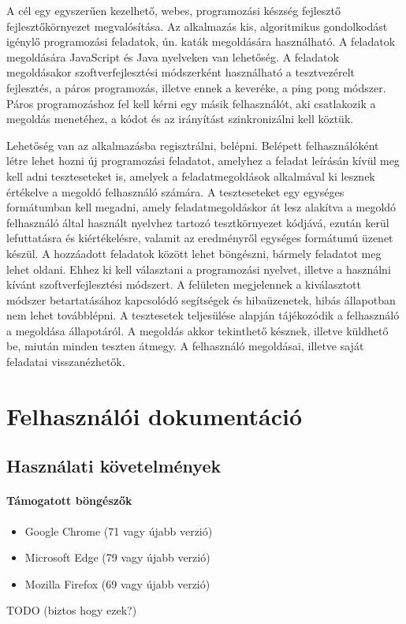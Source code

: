 \documentclass{elteikthesis}
\begin{document}
			A cél egy egyszerűen kezelhető, webes, programozási készség fejlesztő fejlesztőkörnyezet megvalósítása. Az alkalmazás kis, algoritmikus gondolkodást igénylő programozási feladatok, ún. katák megoldására használható. A feladatok megoldására JavaScript és Java nyelveken van lehetőség. A feladatok megoldásakor szoftverfejlesztési módszerként használható a tesztvezérelt fejlesztés, a páros programozás, illetve ennek a keveréke, a ping pong módszer. Páros programozáshoz fel kell kérni egy másik felhasználót, aki csatlakozik a megoldás menetéhez, a kódot és az irányítást szinkronizálni kell köztük.
		
			Lehetőség van az alkalmazásba regisztrálni, belépni. Belépett felhasználóként létre lehet hozni új programozási feladatot, amelyhez a feladat leírásán kívül meg kell adni teszteseteket is, amelyek a feladatmegoldások alkalmával ki lesznek értékelve a megoldó felhasználó számára. A teszteseteket egy egységes formátumban kell megadni, amely feladatmegoldáskor át lesz alakítva a megoldó felhasználó által használt nyelvhez tartozó tesztkörnyezet kódjává, ezután kerül lefuttatásra és kiértékelésre, valamit az eredményről egységes formátumú üzenet készül. A hozzáadott feladatok között lehet böngészni, bármely feladatot meg lehet oldani. Ehhez ki kell választani a programozási nyelvet, illetve a használni kívánt szoftverfejlesztési módszert. A felületen megjelennek a kiválasztott módszer betartatásához kapcsolódó segítségek és hibaüzenetek, hibás állapotban nem lehet továbblépni. A tesztesetek teljesülése alapján tájékozódik a felhasználó a megoldása állapotáról. A megoldás akkor tekinthető késznek, illetve küldhető be, miután minden teszten átmegy. A felhasználó megoldásai, illetve saját feladatai visszanézhetők.

	\chapter{Felhasználói dokumentáció}
		
		\section{Használati követelmények}
			\subsubsection{Támogatott böngészők}
				\begin{itemize}
					\setlength\itemsep{-0.5em}
					\item Google Chrome (71 vagy újabb verzió)
					\item Microsoft Edge (79 vagy újabb verzió)
					\item Mozilla Firefox (69 vagy újabb verzió)
				\end{itemize}
			TODO (biztos hogy ezek?)
		
\end{document}
